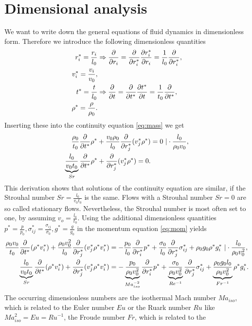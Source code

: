 \chapter{Dimensional analysis}\label{dimanal}
We want to write down the general equations of fluid dynamics in dimensionless
form. Therefore we introduce the following dimensionless quantities
\begin{align*}
r_i^*=\frac{r_i}{l_0} &\Rightarrow
\pd{r_i}=\pd{r_i^*}\ppd{r_i}{r_i^*}=\frac{1}{l_0}\pd{r_i^*},\\
v_i^*=\frac{v_i}{v_0},\\
t^*=\frac{t}{l_0} &\Rightarrow
\pd{t}=\pd{t^*}\ppd{t}{t^*}=\frac{1}{t_0}\pd{t^*},\\
\rho^*=\frac{\rho}{\rho_0}.
\end{align*}
Inserting these into the continuity equation \eqref{eq:mass} we get
\begin{align*}
\frac{\rho_0}{t_0}\pd{t^*}\rho^* 
+ \frac{v_0 \rho_0}{l_0} \pd{r_j^*}(v_j^*\rho^*) &= 0 \ | 
\cdot \frac{l_0}{\rho_0 v_0},\\
\underbrace{\frac{l_0}{v_0 t_0}}_{Sr}\pd{t^*}\rho^* 
+ \pd{r_j^*}(v_j^*\rho^*) = 0.
\end{align*}
This derivation shows that solutions of the continuity equation
are similar, if the Strouhal number $Sr = \frac{l_0}{v_0 t_0}$ is the
same. Flows with a Strouhal number $Sr=0$ are so called stationary flows.
Nevertheless, the Strouhal number is most often set to one, by assuming
$v_o=\frac{l_0}{t_0}$. 
Using the additional dimensionless quantities
$p^*=\frac{p}{p_0},\sigma_{ij}^*=\frac{\sigma_{ij}}{\sigma_0},
g^*=\frac{g}{g_0 }$
in the momentum equation \eqref{eq:mom} yields
\begin{align*}
\frac{\rho_0 v_0}{t_0}\pd{t^*}(\rho^* v_i^*) 
+ \frac{\rho_0 v_0^2}{l_0}\pd{r_j^*}(v_j^* \rho^* v_i^*) &= 
- \frac{p_0}{l_0}\pd{r_i^*}p^* 
+\frac{\sigma_0}{l_0}\pd{r_j^*}\sigma_{ij}^*
+\rho_0 g_0 \rho^* g_i^*\ | \cdot \frac{l_0}{\rho_0 v_0^2},\\
\underbrace{\frac{l_0}{v_0 t_0}}_{Sr}\pd{t^*}(\rho^* v_i^*) 
+ \pd{r_j^*}(v_j^* \rho^* v_i^*) &= 
-\underbrace{\frac{p_0}{\rho_0 v_0^2}}_{Ma^{-2}_{iso}}\pd{r_i^*}p^* 
+\underbrace{\frac{\sigma_0}{\rho_0 v_0^2}}_{Re^{-1}}\pd{r_j^*}\sigma_{ij}^*
+\underbrace{\frac{\rho_0 g_0 l_0}{\rho_0 v_0^2}}_{Fr^{-1}} \rho^* g_i^*.
\end{align*}
The occurring dimensionless numbers are the isothermal Mach number $Ma_{iso}$,
which is related to the Euler number $Eu$ or the Ruark number $Ru$ like
$Ma^2_{iso}=Eu=Ru^{-1}$, the Froude number $Fr$, which is related to the
